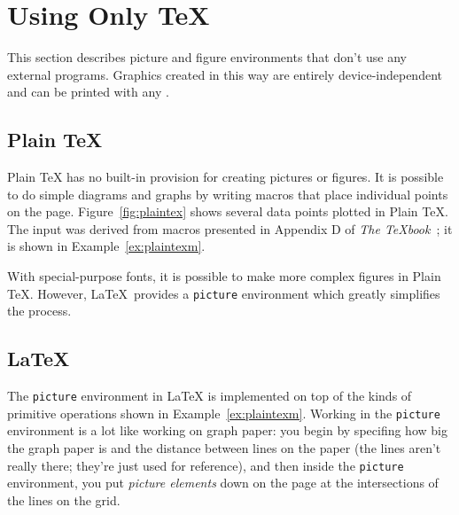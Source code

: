 \section{Using Only \protect\TeX}

This section describes picture and figure environments that don't use
any external programs.  Graphics created in this way are entirely 
device-independent and can be printed with any \dvidriver.

\subsection{Plain \protect\TeX}
\label{sec:ptexpic}

Plain \TeX{} has no 
built-in provision for creating pictures or
figures.  It is possible to do simple diagrams and graphs by writing
macros that place individual points on the page.
Figure~\ref{fig:plaintex} shows several data points plotted in Plain
\TeX.  The input was derived from
macros presented in Appendix D of {\it The
\TeX{}book}~\cite{kn:texbook}; it is shown in
Example~\ref{ex:plaintexm}.



With special-purpose fonts, it is possible to make more complex figures
in Plain \TeX.  However, \LaTeX\ provides a \verb|picture| environment
which greatly simplifies the process.

\subsection{\protect\LaTeX}
\label{sec:pictures:latex}

The \verb|picture| environment 
in \LaTeX{} is implemented on top of
the kinds of primitive operations shown in Example~\ref{ex:plaintexm}.
Working in the \verb|picture|
environment is a lot like working on graph paper: you begin by
specifing how big the graph paper is and the distance between lines on
the paper (the lines aren't really there; they're just used for
reference), and then inside the \verb|picture| environment, you
put \emph{picture elements} down on the page at the intersections of the
lines on the grid.


